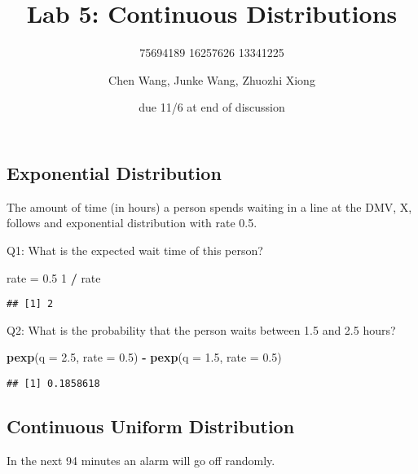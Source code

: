 \documentclass[]{article}
\title{Lab 5: Continuous Distributions}
\subtitle{75694189 16257626 13341225}
\author{Chen Wang, Junke Wang, Zhuozhi Xiong}
\date{due 11/6 at end of discussion}
\newenvironment{Shaded}{\begin{snugshade}}{\end{snugshade}}
\newcommand{\DataTypeTok}[1]{\textcolor[rgb]{0.13,0.29,0.53}{#1}}
\newcommand{\DecValTok}[1]{\textcolor[rgb]{0.00,0.00,0.81}{#1}}
\newcommand{\FloatTok}[1]{\textcolor[rgb]{0.00,0.00,0.81}{#1}}
\newcommand{\KeywordTok}[1]{\textcolor[rgb]{0.13,0.29,0.53}{\textbf{#1}}}
\newcommand{\NormalTok}[1]{#1}
\newcommand{\OperatorTok}[1]{\textcolor[rgb]{0.81,0.36,0.00}{\textbf{#1}}}
\newcommand{\StringTok}[1]{\textcolor[rgb]{0.31,0.60,0.02}{#1}}
\begin{document}
\maketitle

\hypertarget{exponential-distribution}{%
\subsection{Exponential Distribution}\label{exponential-distribution}}

The amount of time (in hours) a person spends waiting in a line at the
DMV, X, follows and exponential distribution with rate 0.5.

Q1: What is the expected wait time of this person?

\begin{Shaded}
\begin{Highlighting}[]
\NormalTok{rate =}\StringTok{ }\FloatTok{0.5}
\DecValTok{1} \OperatorTok{/}\StringTok{ }\NormalTok{rate}
\end{Highlighting}
\end{Shaded}

\begin{verbatim}
## [1] 2
\end{verbatim}

Q2: What is the probability that the person waits between 1.5 and 2.5
hours?

\begin{Shaded}
\begin{Highlighting}[]
\KeywordTok{pexp}\NormalTok{(}\DataTypeTok{q =} \FloatTok{2.5}\NormalTok{, }\DataTypeTok{rate =} \FloatTok{0.5}\NormalTok{) }\OperatorTok{-}\StringTok{ }\KeywordTok{pexp}\NormalTok{(}\DataTypeTok{q =} \FloatTok{1.5}\NormalTok{, }\DataTypeTok{rate =} \FloatTok{0.5}\NormalTok{)}
\end{Highlighting}
\end{Shaded}

\begin{verbatim}
## [1] 0.1858618
\end{verbatim}

\newpage

\hypertarget{continuous-uniform-distribution}{%
\subsection{Continuous Uniform
Distribution}\label{continuous-uniform-distribution}}

In the next 94 minutes an alarm will go off randomly.
\end{document}
